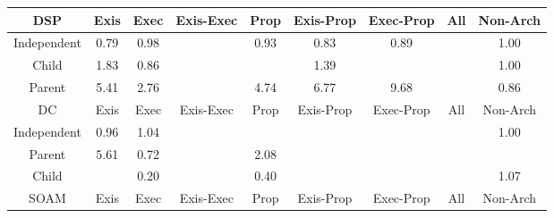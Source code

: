 \begin{tabular}{|c||c|c|c|c|c|c|c|c|}
\hline
\hline
DSP & Exis & Exec & Exis-Exec & Prop & Exis-Prop & Exec-Prop & All & Non-Arch \\ 
\hline
Independent & \cellcolor[rgb]{0.8716875461854184,0.658654385277647,0.38424170977305716} 0.79 & \cellcolor[rgb]{0.9069885561997176,0.8257458326786633,0.41718931911973645} 0.98 &  & \cellcolor[rgb]{0.8968306864275882,0.7776652490905841,0.40770864066574897} 0.93 & \cellcolor[rgb]{0.8779387079173253,0.6882432174753396,0.3900761273895036} 0.83 & \cellcolor[rgb]{0.8898351120335131,0.7445528636252949,0.40117943789794547} 0.89 &  & \cellcolor[rgb]{0.9099343844375233,0.83996891894409,0.42} 1.00 \\ 
\hline
Child & \cellcolor[rgb]{0.8934230489771304,0.8321477600417986,0.42} 1.83 & \cellcolor[rgb]{0.8838029514995742,0.7160006370979844,0.39554942139960253} 0.86 &  &  & \cellcolor[rgb]{0.902155599656938,0.8362842314164443,0.42} 1.39 &  &  & \cellcolor[rgb]{0.909283402080289,0.8366081031800344,0.41933117527493635} 1.00 \\ 
\hline
Parent & \cellcolor[rgb]{0.8219829550236091,0.798307715537499,0.42} 5.41 & \cellcolor[rgb]{0.8748898287962296,0.8233688662718982,0.42} 2.76 &  & \cellcolor[rgb]{0.8353427472348713,0.8046360381638864,0.42} 4.74 & \cellcolor[rgb]{0.7949212750386101,0.7854890250182889,0.41999999999999993} 6.77 & \cellcolor[rgb]{0.7368298962438609,0.757972056115513,0.42} 9.68 &  & \cellcolor[rgb]{0.8846394532903903,0.7199600789078471,0.3963301564043642} 0.86 \\ 
\hline
\hline
DC & Exis & Exec & Exis-Exec & Prop & Exis-Prop & Exec-Prop & All & Non-Arch \\ 
\hline
Independent & \cellcolor[rgb]{0.9032624295835859,0.8081088333623067,0.4137116009446802} 0.96 & \cellcolor[rgb]{0.9091468776926755,0.8395958894333726,0.42} 1.04 &  &  &  &  &  & \cellcolor[rgb]{0.9093982529055396,0.8371517304195534,0.4194383693785035} 1.00 \\ 
\hline
Parent & \cellcolor[rgb]{0.818112495418545,0.7964743399351003,0.42} 5.61 & \cellcolor[rgb]{0.8577415041654648,0.5926431197165334,0.37122540388776715} 0.72 &  & \cellcolor[rgb]{0.8885406022198468,0.829835022104138,0.42} 2.08 &  &  &  &  \\ 
\hline
Child &  & \cellcolor[rgb]{0.76,0.13,0.28} 0.20 &  & \cellcolor[rgb]{0.7985507186540436,0.31247340162913934,0.31598067074377395} 0.40 &  &  &  & \cellcolor[rgb]{0.9086664293482877,0.8393683086386625,0.42} 1.07 \\ 
\hline
\hline
SOAM & Exis & Exec & Exis-Exec & Prop & Exis-Prop & Exec-Prop & All & Non-Arch \\ 

\end{tabular}
